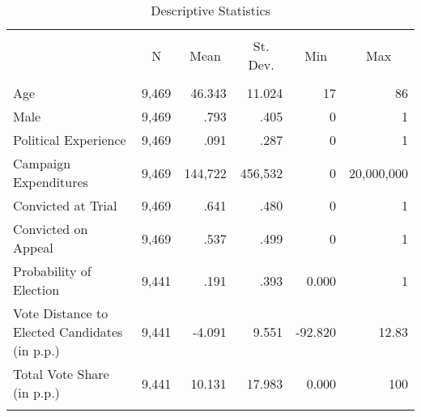 
\begin{table}[!htbp] \centering
  \caption{Descriptive Statistics}
  \label{tab:sumstats}
\scriptsize
\begin{tabular}{@{\extracolsep{2pt}}lrrrrr}
\\[-1.8ex]\hline
\hline \\[-1.8ex]
 & \multicolumn{1}{c}{N} & \multicolumn{1}{c}{Mean} & \multicolumn{1}{c}{St. Dev.} & \multicolumn{1}{c}{Min} & \multicolumn{1}{c}{Max} \\
\hline \\[-1.8ex]
Age                                           & 9,469 & 46.343  & 11.024 & 17 & 86 \\
Male                                          & 9,469 & .793    & .405 & 0 & 1 \\
Political Experience                          & 9,469 & .091    & .287 & 0 & 1 \\
Campaign Expenditures                         & 9,469 & 144,722 & 456,532 & 0 & 20,000,000 \\
Convicted at Trial                            & 9,469 & .641    & .480 & 0 & 1 \\
Convicted on Appeal                           & 9,469 & .537    & .499 & 0 & 1 \\
Probability of Election                       & 9,441 & .191    & .393 & 0.000 & 1 \\
Vote Distance to Elected Candidates (in p.p.) & 9,441 & -4.091  & 9.551 & -92.820 & 12.83 \\
Total Vote Share (in p.p.)                    & 9,441 & 10.131  & 17.983 & 0.000 & 100 \\
\hline \hline \\[-1.8ex]
\end{tabular}
\end{table}
